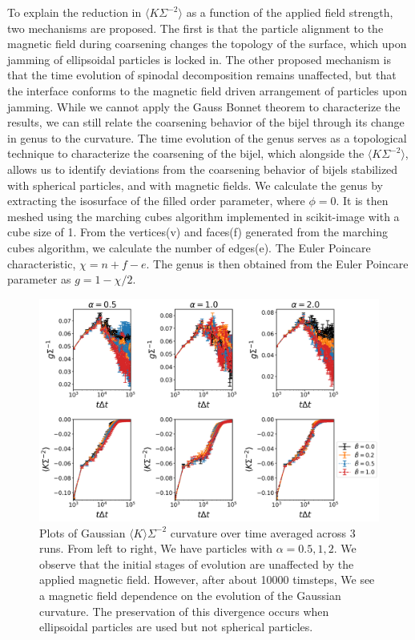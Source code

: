 To explain the reduction in $\langle K\Sigma^{-2} \rangle$ as a function of the applied field strength, two mechanisms are proposed. The first is that 
the particle alignment to the magnetic field during coarsening changes the topology of the surface, which upon jamming of ellipsoidal particles is locked in. 
The other proposed mechanism is that the time evolution of spinodal decomposition remains unaffected, but that the interface conforms to the magnetic field 
driven arrangement of particles upon jamming. While we cannot apply the Gauss Bonnet theorem to characterize the results, we can still relate the coarsening 
behavior of the bijel through its change in genus to the curvature. The time evolution of the genus serves as a topological technique to characterize the 
coarsening of the bijel, which alongside the $\langle K\Sigma^{-2} \rangle$, allows us to identify deviations from the coarsening behavior of bijels 
stabilized with spherical particles, and with magnetic fields. We calculate the genus by extracting the isosurface of the filled order parameter, where 
$\phi = 0$. It is then meshed using the marching cubes algorithm implemented in scikit-image with a cube size of 1. \cite{van2014scikit} From the vertices(v) 
and faces(f) generated from the marching cubes algorithm, we calculate the number of edges(e). The Euler Poincare characteristic, $\chi = n + f - e$. The genus is 
then obtained from the Euler Poincare parameter as $g = 1 - \chi/2$.

\begin{figure} 
    \centering 
    \includegraphics[scale = 0.4]{figures/results/paper1/genus_curvature_vs_coverage.png} 
    \caption{Plots of Gaussian $\langle K \rangle \Sigma^{-2}$ curvature over time averaged across 3 runs. 
    From left to right, We have particles with $\alpha = 0.5, 1, 2$. We observe that the initial stages of 
    evolution are unaffected by the applied magnetic field. However, after about 10000 timsteps, We see a 
    magnetic field dependence on the evolution of the Gaussian curvature. The preservation of this divergence 
    occurs when ellipsoidal particles are used but not spherical particles.} 
    \label{fig:curvature_vs_coverage}
\end{figure}

